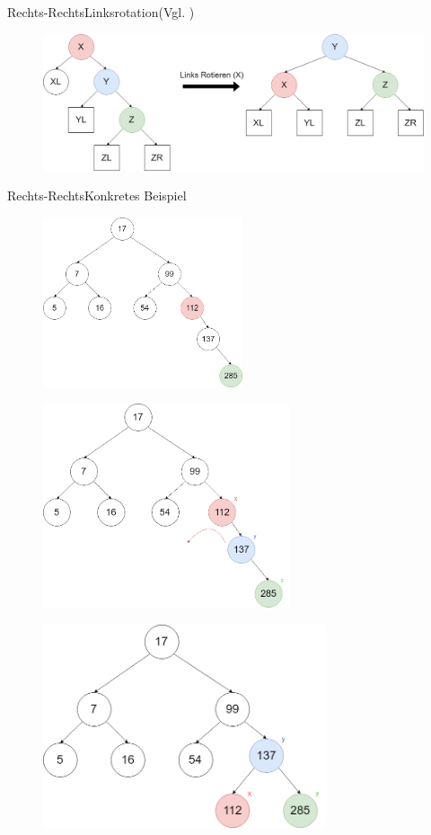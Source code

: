 \begin{frame}{Rechts-Rechts}{Linksrotation(Vgl. \cite{avltree})}
\begin{figure}
	\centering
	\includegraphics[width=\textwidth]{graph/avl_insert_rr}
\end{figure}
\end{frame}

\begin{frame}[allowframebreaks]{Rechts-Rechts}{Konkretes Beispiel}
\begin{figure}[ht!]
	\centering
	\includegraphics[height=5cm]{graph/avl_insert_rr_1}
\end{figure}
\framebreak
\begin{figure}
	\centering
	\includegraphics[height=6cm]{graph/avl_insert_rr_2}
\end{figure}
\framebreak
\begin{figure}
	\centering
	\includegraphics[height=6cm]{graph/avl_insert_rr_3}
\end{figure}

\end{frame}

